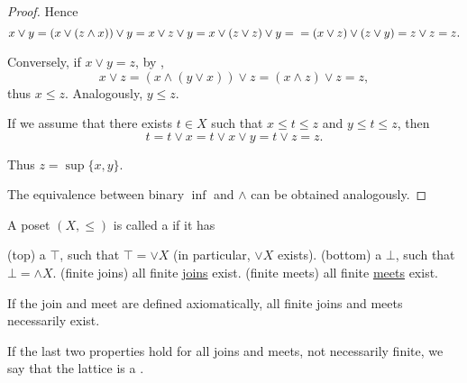 \begin{proof}
  Hence
  \begin{equation*}
    x \vee y = (x \vee (z \wedge x)) \vee y = x \vee z \vee y = x \vee (z \vee z) \vee y = \\ = (x \vee z) \vee (z \vee y) = z \vee z = z.
  \end{equation*}

  Conversely, if \( x \vee y = z \), by ,
  \begin{equation*}
    x \vee z = (x \wedge (y \vee x)) \vee z = (x \wedge z) \vee z = z,
  \end{equation*}
  thus \( x \leq z \). Analogously, \( y \leq z \).

  If we assume that there exists \( t \in X \) such that \( x \leq t \leq z \) and \( y \leq t \leq z \), then
  \begin{equation*}
    t = t \vee x = t \vee x \vee y = t \vee z = z.
  \end{equation*}

  Thus \( z = \sup \{ x, y \} \).

  The equivalence between binary \( \inf \) and \( \wedge \) can be obtained analogously.
\end{proof}

\begin{definition}\label{def:lattice}
  A poset \( (X, \leq) \) is called a  if it has
  \begin{defenum}
    (top) a  \( \top \), such that \( \top = \vee X \) (in particular, \( \vee X \) exists).
    (bottom) a  \( \bot \), such that \( \bot = \wedge X \).
    (finite joins) all finite \hyperref[def:binary_join_meet]{joins} exist.
    (finite meets) all finite \hyperref[def:binary_join_meet]{meets} exist.
  \end{defenum}

  If the join and meet are defined axiomatically, all finite joins and meets necessarily exist.

  If the last two properties hold for all joins and meets, not necessarily finite, we say that the lattice is a .
\end{definition}

